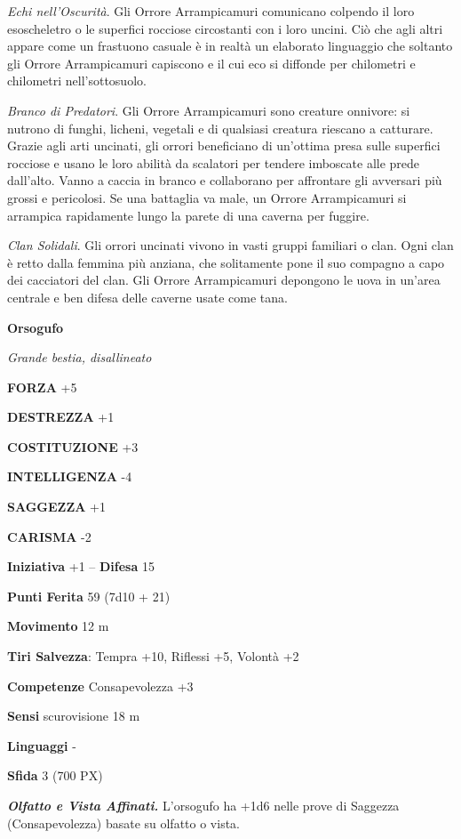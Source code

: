 \begin{multicols}{2}
\textit{Echi nell'Oscurità}. Gli Orrore Arrampicamuri comunicano colpendo il loro esoscheletro o le superfici rocciose circostanti con i loro uncini. Ciò che agli altri appare come un frastuono casuale è in realtà un elaborato linguaggio che soltanto gli Orrore Arrampicamuri capiscono e il cui eco si diffonde per chilometri e chilometri nell'sottosuolo.

\textit{Branco di Predatori}. Gli Orrore Arrampicamuri sono creature onnivore: si nutrono di funghi, licheni, vegetali e di qualsiasi creatura riescano a catturare. Grazie agli arti uncinati, gli orrori beneficiano di un'ottima presa sulle superfici rocciose e usano le loro abilità da scalatori per tendere imboscate alle prede dall'alto. Vanno a caccia in branco e collaborano per affrontare gli avversari più grossi e pericolosi. Se una battaglia va male, un Orrore Arrampicamuri si arrampica rapidamente lungo la parete di una caverna per fuggire.

\textit{Clan Solidali}. Gli orrori uncinati vivono in vasti gruppi familiari o clan. Ogni clan è retto dalla femmina più anziana, che solitamente pone il suo compagno a capo dei cacciatori del clan. Gli Orrore Arrampicamuri depongono le uova in un'area centrale e ben difesa delle caverne usate come tana.

\medskip{}\textbf{Orsogufo}

\textit{Grande bestia, disallineato}

\textbf{FORZA} +5

\textbf{DESTREZZA} +1

\textbf{COSTITUZIONE} +3

\textbf{INTELLIGENZA} -4

\textbf{SAGGEZZA} +1

\textbf{CARISMA} -2

\textbf{Iniziativa} +1 -- \textbf{Difesa} 15

\textbf{Punti Ferita} 59 (7d10 + 21)

\textbf{Movimento} 12 m

\textbf{Tiri Salvezza}: Tempra +10, Riflessi +5, Volontà +2

\textbf{Competenze} Consapevolezza +3

\textbf{Sensi} scurovisione 18 m

\textbf{Linguaggi} -

\textbf{Sfida} 3 (700 PX)

\textit{\textbf{Olfatto e Vista Affinati.}} L'orsogufo ha +1d6 nelle prove di Saggezza (Consapevolezza) basate su olfatto o vista.


\end{multicols}
